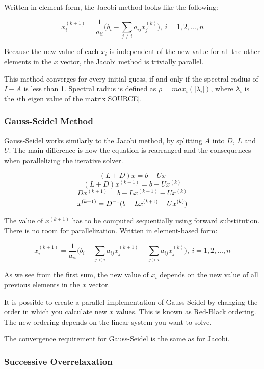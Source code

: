 Written in element form, the Jacobi method looks like the following:

$$ x_i^{(k+1)} = \frac{1}{a_{ii}} \Big( b_i - \sum_{j \neq i} a_{ij} x_j^{(k)} \Big), ~ i = 1, 2, \ldots, n $$

Because the new value of each $x_i$ is independent of the new value for all the 
other elements in the $x$ vector, the Jacobi method is trivially parallel.

This method converges for every initial guess, if and only if the spectral
radius of $I - A$ is less than 1\cite{Kreyszig}. Spectral radius is defined as 
$\rho = max_i(| \lambda_i |)$, where $\lambda_i$ is the $i$th eigen value of the
matrix[SOURCE].

\subsubsection{Gauss-Seidel Method}

Gauss-Seidel works similarly to the Jacobi method, by splitting $A$ into $D$, 
$L$ and $U$. The main difference is how the equation is rearranged and the consequences 
when parallelizing the iterative solver. 

$$ (L+D)x = b - Ux $$
$$ (L+D)x^{(k+1)} = b - Ux^{(k)} $$
$$ Dx^{(k+1)} = b - Lx^{(k+1)} - Ux^{(k)} $$
$$ x^{(k+1)} = {D}^{-1}(b - Lx^{(k+1)} - Ux^{(k)}) $$

The value of $x^{(k+1)}$ has to be computed sequentially using forward substitution. 
There is no room for parallelization. Written in element-based form:

$$ x_i^{(k+1)} = \frac{1}{a_{ii}} \Big( b_i - \sum_{j < i} a_{ij} x_j^{(k+1)} 
- \sum_{j > i} a_{ij} x_j^{(k)} \Big), ~ i = 1, 2, \ldots, n $$

As we see from the first sum, the new value of $x_i$ depends on the new value of 
all previous elements in the $x$ vector.

It is possible to create a parallel implementation of Gauss-Seidel by changing
the order in which you calculate new $x$ values. This is known as Red-Black
ordering. The new ordering depends on the linear system you want to solve.

The convergence requirement for Gauss-Seidel is the same as for Jacobi.

\subsubsection{Successive Overrelaxation}

